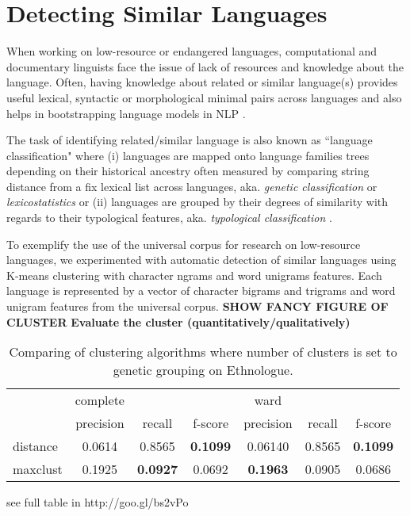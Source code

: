 \section{Detecting Similar Languages} \label{sec:cluster}

When working on low-resource or endangered languages, computational and documentary linguists face the issue of lack of resources and knowledge about the language. Often, having knowledge about related or similar language(s) provides useful lexical, syntactic or morphological minimal pairs across languages and also helps in bootstrapping language models in NLP \cite{yarowsky:ngai:2001,xia2007multilingual}.

The task of identifying related/similar language is also known as ``language classification" where (i) languages are mapped onto language families trees depending on their historical ancestry often measured by comparing string distance from a fix lexical list across languages, aka. \emph{genetic classification} or \emph{lexicostatistics} \cite{swadesh1952,starostin2010} or (ii) languages are grouped by their degrees of similarity with regards to their typological features, aka. \emph{typological classification} \cite{georgi2010wals,daume2009}.

To exemplify the use of the universal corpus for research on low-resource languages, we experimented with automatic detection of similar languages using K-means clustering with character ngrams and word unigrams features. Each language is represented by a vector of character bigrams and trigrams and word unigram features from the universal corpus. 
\newline \newline
\noindent \textbf{SHOW FANCY FIGURE OF CLUSTER}
\newline \newline
\textbf{Evaluate the cluster (quantitatively/qualitatively)}


\begin{table*}[h!]
\begin{centering}

    \begin{tabular}{l|ccc|ccc}
    ~        & complete & ~       & ~       & ward    & ~       & ~       \\ \cline{2-7}
    ~        & precision & recall       & f-score       & precision    & recall       & f-score      \\ \hline
    distance & 0.0614   & 0.8565 & \textbf{0.1099} & 0.06140  & 0.8565 & \textbf{0.1099} \\
    maxclust & 0.1925  & \textbf{0.0927} & 0.0692 & \textbf{0.1963} & 0.0905 & 0.0686  \\
    \end{tabular}
\caption{Comparing of clustering algorithms where number of clusters is set to genetic grouping on Ethnologue.}
\end{centering}
\end{table*}

\noindent
see full table in http://goo.gl/bs2vPo
